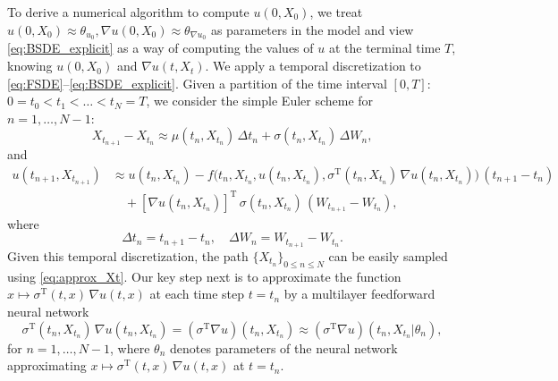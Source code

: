 \documentclass[11pt,english]{article}
\begin{document}
To derive a numerical algorithm to compute $u(0, X_0)$, 
we treat $u(0,X_{0}) \approx \theta_{u_0}, \nabla u(0,X_{0})\approx\theta_{\nabla u_0}$ 
as parameters in the model and 
view \eqref{eq:BSDE_explicit} as a way of computing the values of $u$ at the terminal 
time $T$, knowing $u(0, X_0)$ and $\nabla u(t, X_t)$.
We apply a temporal discretization to \eqref{eq:FSDE}--\eqref{eq:BSDE_explicit}. 
Given a partition of the time interval $[0, T]$:
$0 = t_0 < t_1 < \ldots < t_N = T$, we consider the simple Euler scheme for $n = 1, \dots, N-1$:
\begin{equation}
\label{eq:approx_Xt}
  X_{ t_{ n + 1 } } - X_{ t_n } \approx
  \mu( t_n, X_{ t_n } )\,\Delta t_n +
  \sigma( t_n, X_{ t_n } )\,\Delta W_n,
\end{equation}
and
\begin{equation}
\label{eq:approx_ut}
\begin{split}
  u( t_{ n + 1 },X_{t_{n+1}})
& \approx u( t_{ n },X_{t_{n}}) -
  f\big( 
    t_n, X_{ t_n }, u( t_{ n },X_{t_{n}}) , \sigma^{ \operatorname{T} }( t_n, X_{ t_n } )
    \,
    \nabla u( t_n, X_{ t_n } ) 
  \big)
  \,( t_{ n + 1 } - t_n )\\
&\quad +
    [ \nabla u( t_n, X_{ t_n } ) ]^{ \operatorname{T} } 
    \, \sigma( t_n, X_{ t_n } ) \,
    ( W_{ t_{ n + 1 } }-W_{ t_n }),
\end{split}
\end{equation}
where
\begin{equation}
  \label{eq:time_discret}
  \Delta t_n = t_{ n + 1 } - t_n, \quad \Delta W_n = W_{ t_{ n + 1 } }-W_{ t_n }.
\end{equation}
Given this temporal discretization, the path 
$
  \{ X_{ t_n } \}_{ 0 \leq n \leq N }
$
can be easily sampled using \eqref{eq:approx_Xt}. Our key step next is to approximate the function
$ x \mapsto \sigma^{ \operatorname{T} }(t,x) \, \nabla u(t,x)$
at each time step $ t = t_n $ 
by a multilayer feedforward neural network
\begin{equation}
\label{eq:approx_grad}
  \sigma^{ \operatorname{T} }( t_n , X_{ t_n } ) 
  \, 
  \nabla u( t_n, X_{ t_n } ) 
  =
  ( \sigma^{ \operatorname{T} } \nabla u )( t_n , X_{ t_n } )
  \approx ( \sigma^{ \operatorname{T} } \nabla u )( t_n, X_{ t_n } | \theta_n),
\end{equation}
for $n = 1, \dots, N-1$, where $\theta_n$ denotes parameters of the neural network approximating 
$ x \mapsto \sigma^{ \operatorname{T} }(t,x) \, \nabla u(t,x)$
at $ t = t_n $.
\end{document}
